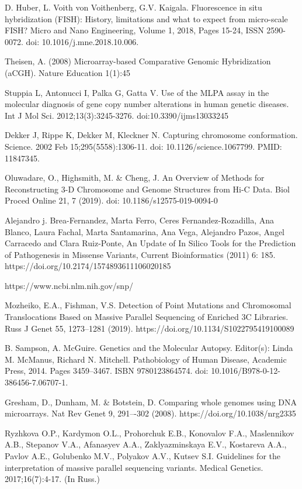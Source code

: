 \documentclass[a4paper,12pt]{article}
\begin{document}
\begin{thebibliography}{100}
D. Huber, L. Voith von Voithenberg, G.V. Kaigala. Fluorescence in situ hybridization (FISH): History, limitations and what to expect from micro-scale FISH? Micro and Nano Engineering, Volume 1, 2018, Pages 15-24, ISSN 2590-0072. doi: 10.1016/j.mne.2018.10.006.

Theisen, A. (2008) Microarray-based Comparative Genomic Hybridization (aCGH). Nature Education 1(1):45

Stuppia L, Antonucci I, Palka G, Gatta V. Use of the MLPA assay in the molecular diagnosis of gene copy number alterations in human genetic diseases. Int J Mol Sci. 2012;13(3):3245-3276. doi:10.3390/ijms13033245

Dekker J, Rippe K, Dekker M, Kleckner N. Capturing chromosome conformation. Science. 2002 Feb 15;295(5558):1306-11. doi: 10.1126/science.1067799. PMID: 11847345.

Oluwadare, O., Highsmith, M. \& Cheng, J. An Overview of Methods for Reconstructing 3-D Chromosome and Genome Structures from Hi-C Data. Biol Proced Online 21, 7 (2019). doi: 10.1186/s12575-019-0094-0

Alejandro j. Brea-Fernandez, Marta Ferro, Ceres Fernandez-Rozadilla, Ana Blanco, Laura Fachal, Marta Santamarina, Ana Vega, Alejandro Pazos, Angel Carracedo and Clara Ruiz-Ponte, An Update of In Silico Tools for the Prediction of Pathogenesis in Missense Variants, Current Bioinformatics (2011) 6: 185. https://doi.org/10.2174/1574893611106020185 

https://www.ncbi.nlm.nih.gov/snp/

Mozheiko, E.A., Fishman, V.S. Detection of Point Mutations and Chromosomal Translocations Based on Massive Parallel Sequencing of Enriched 3C Libraries. Russ J Genet 55, 1273–1281 (2019). https://doi.org/10.1134/S1022795419100089

B. Sampson, A. McGuire. Genetics and the Molecular Autopsy. Editor(s): Linda M. McManus, Richard N. Mitchell. Pathobiology of Human Disease, Academic Press, 2014. Pages 3459--3467. ISBN 9780123864574. doi: 10.1016/B978-0-12-386456-7.06707-1.

Gresham, D., Dunham, M. \& Botstein, D. Comparing whole genomes using DNA microarrays. Nat Rev Genet 9, 291–-302 (2008). https://doi.org/10.1038/nrg2335

Ryzhkova O.P., Kardymon O.L., Prohorchuk E.B., Konovalov F.A., Maslennikov A.B., Stepanov V.A., Afanasyev A.A., Zaklyazminskaya E.V., Kostareva A.A., Pavlov A.E., Golubenko M.V., Polyakov A.V., Kutsev S.I. Guidelines for the interpretation of massive parallel sequencing variants. Medical Genetics. 2017;16(7):4-17. (In Russ.) 
\end{thebibliography}
\end{document}
